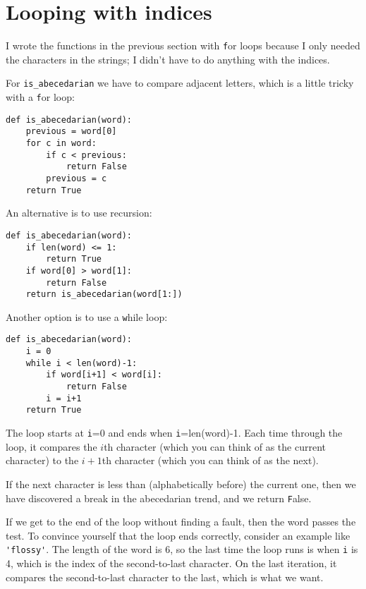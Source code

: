 \documentclass[
DIV=11,
fontsize=12,
twoside,
headinclude=false,
titlepage=firstiscover,
abstract=true,
headsepline=true,
footsepline=true,
chapterprefix=true, %
headings=big,
bibliography=totoc,%
captions=tableheading
]{scrbook}
\theoremstyle{definition}
\begin{document}
\section{Looping with indices}

I wrote the functions in the previous section with {\texttt for}
loops because I only needed the characters in the strings; I didn't
have to do anything with the indices.

For \verb"is_abecedarian" we have to compare adjacent letters,
which is a little tricky with a {\texttt for} loop:

\begin{lstlisting}
def is_abecedarian(word):
    previous = word[0]
    for c in word:
        if c < previous:
            return False
        previous = c
    return True
\end{lstlisting}

An alternative is to use recursion:

\begin{lstlisting}
def is_abecedarian(word):
    if len(word) <= 1:
        return True
    if word[0] > word[1]:
        return False
    return is_abecedarian(word[1:])
\end{lstlisting}

Another option is to use a {\texttt while} loop:

\begin{lstlisting}
def is_abecedarian(word):
    i = 0
    while i < len(word)-1:
        if word[i+1] < word[i]:
            return False
        i = i+1
    return True
\end{lstlisting}
%
The loop starts at {\texttt i=0} and ends when {\texttt i=len(word)-1}.  Each
time through the loop, it compares the $i$th character (which you can
think of as the current character) to the $i+1$th character (which you
can think of as the next).

If the next character is less than (alphabetically before) the current
one, then we have discovered a break in the abecedarian trend, and
we return {\texttt False}.

If we get to the end of the loop without finding a fault, then the
word passes the test.  To convince yourself that the loop ends
correctly, consider an example like \verb"'flossy'".  The
length of the word is 6, so
the last time the loop runs is when {\texttt i} is 4, which is the
index of the second-to-last character.  On the last iteration,
it compares the second-to-last character to the last, which is
what we want.
\end{document}
